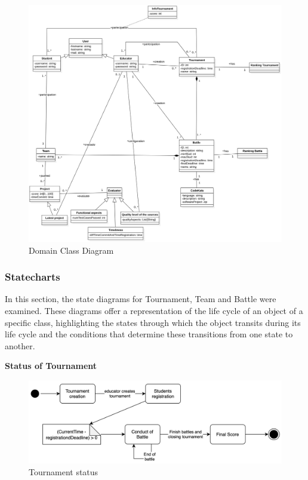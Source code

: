 \begin{figure}[h]
    \centering
    \includegraphics[scale=0.55]{images/ClassDiagramCKB.png} 
    \caption{Domain Class Diagram}
    \label{fig_DomainClassDiagram}
\end{figure}

\clearpage
\subsubsection{Statecharts}
In this section, the state diagrams for Tournament, Team and Battle were examined.
\newline
These diagrams offer a representation of the life cycle of an object of a specific class, highlighting the states through which the object transits during its life cycle and the conditions that determine these transitions from one state to another.

\vspace{1\baselineskip}

\textbf{Status of Tournament}

\begin{figure}[h]
    \centering
    \includegraphics[scale=0.4]{images/Statecharts/TournamentCreation.png} 
    \caption{Tournament status}
    \label{fig_TournamentCreation}
\end{figure}

